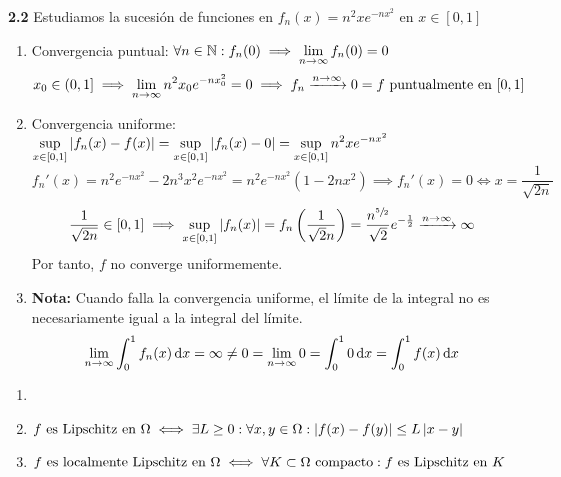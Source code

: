 \textbf{2.2} Estudiamos la sucesión de funciones en $f_n(x)=n^2xe^{-nx^2} $ en $x\in [0,1]$
\begin{enumerate}
	\item Convergencia puntual: $\displaystyle \forall n \in \mathbb{N} : f_n(0) \implies \lim_{n\to\infty} f_n(0) = 0$
	      \[x_0 \in (0, 1] \implies \lim_{n\to \infty} n^2x_0e^{-nx_0^2} = 0 \implies f_n\xrightarrow{n\to \infty} 0 = f \text{ puntualmente en } [0,1]\]
	\item Convergencia uniforme: $\displaystyle \sup_{x\in [0,1]} \left|f_n(x)-f(x)\right| = \sup_{x\in [0,1]} \left|f_n(x)-0\right| = \sup_{x\in [0,1]} n^2xe^{-nx^2}$
	      \[f_n'(x) = n^2e^{-nx^2} - 2n^3x^2e^{-nx^2} = n^2e^{-nx^2}(1-2nx^2) \implies f_n'(x)=0 \iff x=\frac{1}{\sqrt{2n}}\]
	      \[\frac{1}{\sqrt{2n}} \in [0, 1] \implies \sup_{x\in[0, 1]} \left|f_n(x)\right| = f_n\left(\frac{1}{\sqrt{2}n}\right) = \frac{n^{\sfrac{5}{2}}}{\sqrt{2}}e^{-\frac{1}{2}} \xrightarrow{n\to\infty} \infty\]
	      Por tanto, $f$ no converge uniformemente.
	\item \textbf{Nota:} Cuando falla la convergencia uniforme, el límite de la integral no es necesariamente igual a la integral del límite.
	      \[\ds \lim_{n\to\infty} \int_{0}^{1} f_n(x) \odif{x} = \infty \ne 0 = \lim_{n\to\infty} 0 = \int_{0}^{1} 0 \odif{x} = \int_{0}^{1} f(x) \odif{x}\]
\end{enumerate}

\begin{obs}
	\begin{enumerate}
		\item[]
		\item $\displaystyle f \text{ es Lipschitz en } \Omega \iff \exists L \geq 0 : \forall x, y \in \Omega : \left|f(x)-f(y)\right|\leq L\left|x-y\right|$
		\item $\displaystyle f \text{ es localmente Lipschitz en } \Omega \iff \forall K \subset \Omega \text{ compacto} : f \text{ es Lipschitz en } K$ 
	\end{enumerate}
\end{obs}
